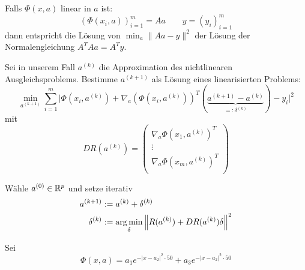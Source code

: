 \documentclass[
]{mycourse}
\begin{document}
Falls $\Phi(x,a)$ linear in $a$ ist:
\[
	(\Phi(x_i, a))_{i=1}^m = A a
	\qquad y = (y_i)_{i=1}^m
\]
dann entspricht die Lösung von $\min_{a} \| Aa - y\|^2$ der Lösung der Normalengleichung $A^TA a = A^T y$.

Sei in unserem Fall $a^{(k)}$ die Approximation des nichtlinearen Ausgleichsproblems.
Bestimme $a^{(k+1)}$ als Lösung eines linearisierten Problems:
\[
	\min_{a^{(k+1)}} \sum_{i=1}^m \Big| \Phi(x_i, a^{(k)}) + \nabla_a(\Phi(x_i, a^{(k)}))^T (\underbrace{a^{(k+1)} - a^{(k)}}_{=: \delta^{(k)}}) - y_i \Big|^2
\]
mit
\[
	DR (a^{(k)}) = \begin{pmatrix}
		\nabla_a \Phi(x_1, a^{(k)})^T \\
		\vdots \\
		\nabla_a \Phi(x_m, a^{(k)})^T \\
	\end{pmatrix}
\]

\begin{df} \label{4.27}
	Wähle $a^{(0)} \in \mathbb{R}^p$ und setze iterativ
	\begin{align*}
		a^{(k+1)} &:= a^{(k)} + \delta^{(k)} \\
		\delta^{(k)} &:=  \argmin_{\delta} \Big\| R(a^{(k)}) + DR(a^{(k)}) \delta \Big\|^2
	\end{align*}
\end{df}

\begin{ex*}
	Sei
	\[
		\Phi(x, a) = a_1 e^{-|x - a_2|^2 \cdot 50} + a_3 e^{-|x-a_2|^2 \cdot 50}
	\]
\end{ex*}
\end{document}
